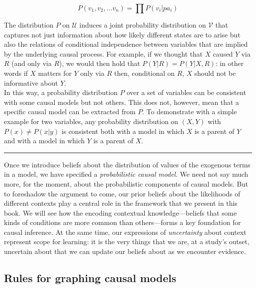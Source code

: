\documentclass[
  12pt,
]{book}
\begin{document}
\begin{equation} 
P(v_1,v_2,\dots v_n) = \prod P(v_i|pa_i)
\label{eq:markov}
\end{equation}

The distribution \(P\) on \(\mathcal{U}\) induces a joint probability distribution on \(\mathcal{V}\) that captures not just information about how likely different states are to arise but also the relations of conditional independence between variables that are implied by the underlying causal process. For example, if we thought that \(X\) caused \(Y\) via \(R\) (and only via \(R\)), we would then hold that \(P(Y | R) = P(Y | X, R)\): in other words if \(X\) matters for \(Y\) only via \(R\) then, conditional on \(R\), \(X\) should not be informative about \(Y\).\\
In this way, a probability distribution \(P\) over a set of variables can be consistent with some causal models but not others. This does not, however, mean that a specific causal model can be extracted from \(P\). To demonstrate with a simple example for two variables, any probability distribution on \((X,Y)\) with \(P(x)\neq P(x|y)\) is consistent both with a model in which \(X\) is a parent of \(Y\) and with a model in which \(Y\) is a parent of \(X\).

\begin{center}\rule{0.5\linewidth}{0.5pt}\end{center}

Once we introduce beliefs about the distribution of values of the exogenous terms in a model, we have specified a \emph{probabilistic causal model.} We need not say much more, for the moment, about the probabilistic components of causal models. But to foreshadow the argument to come, our prior beliefs about the likelihoods of different contexts play a central role in the framework that we present in this book. We will see how the encoding contextual knowledge---beliefs that some kinds of conditions are more common than others---forms a key foundation for causal inference. At the same time, our expressions of \emph{uncertainty} about context represent scope for learning: it is the very things that we are, at a study's outset, uncertain about that we can update our beliefs about as we encounter evidence.

\hypertarget{rules-for-graphing-causal-models}{%
\subsection{Rules for graphing causal models}\label{rules-for-graphing-causal-models}}
\end{document}
